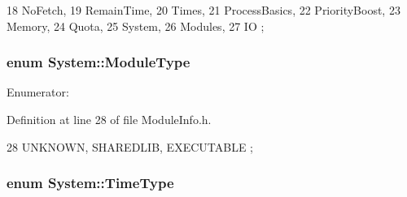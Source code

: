 \begin{DoxyCode}
18                   {   NoFetch, 
19                       RemainTime, 
20                       Times, 
21                       ProcessBasics, 
22                       PriorityBoost, 
23                       Memory, 
24                       Quota,
25                       System, 
26                       Modules, 
27                       IO };
\end{DoxyCode}
\hypertarget{namespaceSystem_a12d36cf455e22c1e75ef65a2105df4c5}{
\subsubsection[{ModuleType}]{\setlength{\rightskip}{0pt plus 5cm}enum {\bf System::ModuleType}}}
\label{namespaceSystem_a12d36cf455e22c1e75ef65a2105df4c5}
\begin{Desc}
\item[Enumerator: ]\par
\begin{description}
\item[{\em 
\hypertarget{namespaceSystem_a12d36cf455e22c1e75ef65a2105df4c5a674d015a465c28de6e2f385f071c25a2}{
UNKNOWN}
\label{namespaceSystem_a12d36cf455e22c1e75ef65a2105df4c5a674d015a465c28de6e2f385f071c25a2}
}]\item[{\em 
\hypertarget{namespaceSystem_a12d36cf455e22c1e75ef65a2105df4c5a2caa15b2f0df35f7d8b6c3d3f9f52d44}{
SHAREDLIB}
\label{namespaceSystem_a12d36cf455e22c1e75ef65a2105df4c5a2caa15b2f0df35f7d8b6c3d3f9f52d44}
}]\item[{\em 
\hypertarget{namespaceSystem_a12d36cf455e22c1e75ef65a2105df4c5a130859e092dc88d9e2eed92640885830}{
EXECUTABLE}
\label{namespaceSystem_a12d36cf455e22c1e75ef65a2105df4c5a130859e092dc88d9e2eed92640885830}
}]\end{description}
\end{Desc}



Definition at line 28 of file ModuleInfo.h.


\begin{DoxyCode}
28 { UNKNOWN, SHAREDLIB, EXECUTABLE };
\end{DoxyCode}
\hypertarget{namespaceSystem_a15db094516c062b412df2453b4350f1a}{
\subsubsection[{TimeType}]{\setlength{\rightskip}{0pt plus 5cm}enum {\bf System::TimeType}}}
\label{namespaceSystem_a15db094516c062b412df2453b4350f1a}


